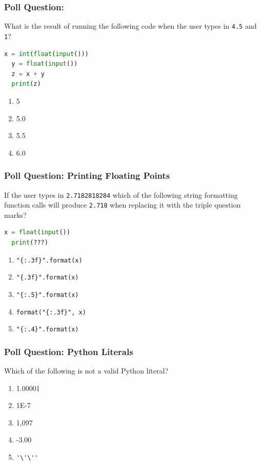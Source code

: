\documentclass{beamer}
\begin{document}
%
%
%
\begin{frame}[fragile]
  \frametitle{Poll Question: }
  What is the result of running the following code when the user types in \lstinline|4.5| and \lstinline|1|?
  \begin{lstlisting}[language=Python]
  x = int(float(input()))
  y = float(input())
  z = x + y
  print(z)
  \end{lstlisting}
  \vfill
  \begin{enumerate}
    \item 5
    \item 5.0
    \item 5.5
    \item 6.0
  \end{enumerate}
\end{frame}

%
%
%
\begin{frame}[fragile]
  \frametitle{Poll Question: Printing Floating Points}
  If the user types in \lstinline|2.7182818284| which of the following string formatting function calls will produce \lstinline|2.718| when replacing it with the triple question marks?
  \begin{lstlisting}[language=Python]
  x = float(input())
  print(???)
  \end{lstlisting}
  \vfill
  \begin{enumerate}
    \item \lstinline|"{:.3f}".format(x)|
    \item \lstinline|"{.3f}".format(x)|
    \item \lstinline|"{:.5}".format(x)|
    \item \lstinline|format("{:.3f}", x)|
    \item \lstinline|"{:.4}".format(x)|
  \end{enumerate}
\end{frame}

%
%
%
\begin{frame}[fragile]
  \frametitle{Poll Question: Python Literals}
  Which of the following is not a valid Python literal?
  \begin{enumerate}[A]
    \item 1.00001
    \item 1E-7
    \item 1,097
    \item -3.00
    \item \lstinline{'\'\''}
  \end{enumerate}
\end{frame}
\end{document}
